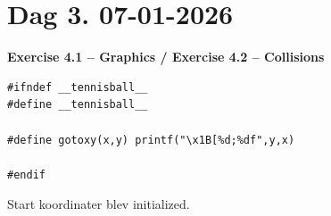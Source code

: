 \section*{Dag 3. 07-01-2026}
\vspace{1em}

\textbf{Exercise 4.1 – Graphics / Exercise 4.2 – Collisions}
\vspace{1em}

\begin{lstlisting}
#ifndef __tennisball__
#define __tennisball__

#define gotoxy(x,y) printf("\x1B[%d;%df",y,x)

#endif
\end{lstlisting}
\vspace{-2em}

Start koordinater blev initialized.

